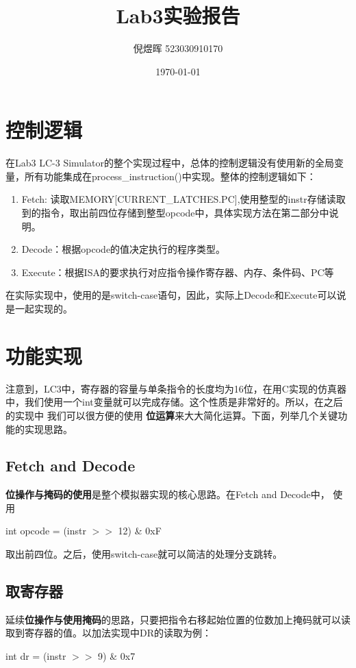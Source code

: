\documentclass[UTF8]{ctexart}
\begin{document}
\title{Lab3实验报告}
\author{倪煜晖 523030910170}
\date{\today}
\maketitle

\section{控制逻辑}
在Lab3 LC-3 Simulator的整个实现过程中，总体的控制逻辑没有使用新的全局变量，所有功能集成在process\_instruction()中实现。整体的控制逻辑如下：

\begin{enumerate}
    \item Fetch: 读取MEMORY[CURRENT\_LATCHES.PC],使用整型的instr存储读取到的指令，取出前四位存储到整型opcode中，具体实现方法在第二部分中说明。
    \item Decode：根据opcode的值决定执行的程序类型。
    \item Execute：根据ISA的要求执行对应指令操作寄存器、内存、条件码、PC等
\end{enumerate}
在实际实现中，使用的是switch-case语句，因此，实际上Decode和Execute可以说是一起实现的。
\section{功能实现}
注意到，LC3中，寄存器的容量与单条指令的长度均为16位，在用C实现的仿真器中，我们使用一个int变量就可以完成存储。这个性质是非常好的。所以，在之后的实现中
我们可以很方便的使用 \textbf{位运算}来大大简化运算。下面，列举几个关键功能的实现思路。

\subsection{Fetch and Decode}
\textbf{位操作与掩码的使用}是整个模拟器实现的核心思路。在Fetch and Decode中，
使用

{\centering int opcode = (instr $>>$ 12) \& 0xF \par}

取出前四位。之后，使用switch-case就可以简洁的处理分支跳转。

\subsection{取寄存器}
延续\textbf{位操作与使用掩码}的思路，只要把指令右移起始位置的位数加上掩码就可以读取到寄存器的值。以加法实现中DR的读取为例：

{\centering int dr = (instr $>>$ 9) \& 0x7 \par}
\end{document}
